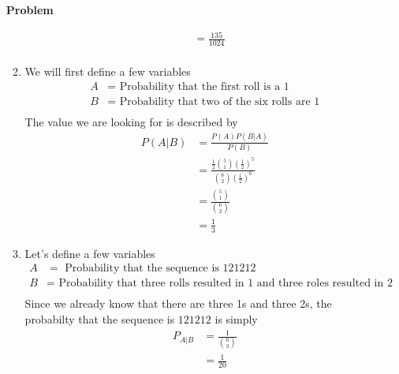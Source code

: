 \documentclass[12pt]{article}
\newenvironment{Ex}{\textbf{Problem}\vspace{.75em}\\}{}
\begin{document}
\begin{enumerate}
\begin{Ex}
\begin{solution}
\begin{enumerate}
\begin{equation}
\begin{aligned}
            &= \frac{135}{1024} \\
          \end{aligned}
        \end{equation}
      \item We will first define a few variables
        \begin{equation}
          \label{eq:6b-decl}
          \begin{aligned}
            A &= \text{ Probability that the first roll is a 1} \\
            B &= \text{ Probability that two of the six rolls are 1} \\
          \end{aligned}
        \end{equation}
        The value we are looking for is described by
        \begin{equation}
          \label{eq:6b-sol}
          \begin{aligned}
            P(A|B) &= \frac{P(A)P(B|A)}{P(B)} \\
            &= \frac{\frac{1}{2}{5 \choose 1}
              \left(\frac{1}{2}\right)^5}
            {{6 \choose 2}\left(\frac{1}{2}\right)^6} \\
            &= \frac{{5 \choose 1}}{{6 \choose 2}} \\
            &= \frac{1}{3} \
          \end{aligned}
        \end{equation}
      \item Let's define a few variables
        \begin{equation}
          \label{eq:6b-decl}
          \begin{aligned}
            A &= \text{ Probability that the sequence is } 121212 \\
            B &= \text{ Probability that three rolls resulted in 1 and
            three roles resulted in 2} \\
          \end{aligned}
        \end{equation}
        Since we already know that there are three 1s and three 2s,
        the probabilty that the sequence is $121212$ is simply
        \begin{equation}
          \label{eq:6c-sol}
          \begin{aligned}
            P_{A|B} &= \frac{1}{{6 \choose 3}} \\
            &=  \frac{1}{20} \\
          \end{aligned}
        \end{equation}
      \end{enumerate}
    \end{solution}
  \end{Ex}
\end{enumerate}
\end{document}
